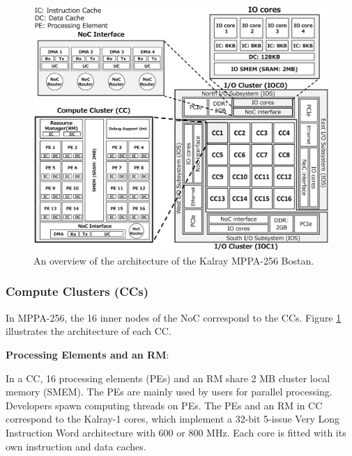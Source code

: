 \documentclass[conference,compsoc]{IEEEtran}
\newcommand{\comment}[1]{}
\begin{document}
\begin{figure}[t]
  \centering
  \includegraphics[width=1.0\linewidth]{../figure/mppa_architecture.eps}
  \vspace{-7mm}
  \caption{\label{fig:mppa_architecture}
    An overview of the architecture of the Kalray MPPA-256 Bostan.}
  \vspace{-5mm}
\end{figure}

\vspace{-2mm}
\subsubsection{Compute Clusters (CCs)}
\label{sec:cc}
In MPPA-256, the 16 inner nodes of the NoC correspond to the CCs.
Figure \ref{fig:mppa_architecture} illustrates the architecture of each CC.

\textbf{Processing Elements and an RM}:
\comment{2-3}
In a CC, 16 processing elements (PEs) and an RM share 2 MB cluster local memory (SMEM).
The PEs are mainly used by users for parallel processing.
Developers spawn computing threads on PEs.
The PEs and an RM in CC correspond to the Kalray-1 cores, which implement a 32-bit 5-issue Very Long Instruction Word architecture with 600 or 800 MHz.
Each core is fitted with its own instruction and data caches.
\end{document}
